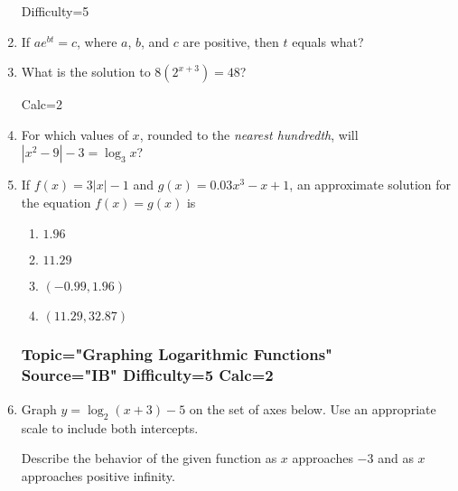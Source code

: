 \documentclass[12pt, oneside]{article}
\begin{document}
\begin{enumerate}
Difficulty=5
\item If $ae^{bt}=c$, where $a$, $b$, and $c$ are positive, then $t$ equals what? %

\item What is the solution to $8(2^{x+3})=48$? %

Calc=2
\item For which values of $x$, rounded to the \emph{nearest hundredth}, will $|x^2-9|-3= \log_3 x$?  %

\item If $f(x)=3|x| -1$ and $g(x)= 0.03x^3 -x +1$, an approximate solution for the equation $f(x)= g(x)$ is
\begin{enumerate}
    \item $1.96$
    \item $11.29$
    \item $(-0.99, 1.96)$
    \item $(11.29, 32.87)$
\end{enumerate}

\subsubsection*{Topic="Graphing Logarithmic Functions"\\
Source="IB" 
Difficulty=5 
Calc=2}

\item Graph $y= \log_2(x+3)-5$ on the set of axes below. Use an appropriate scale to include both intercepts.
\begin{center}
\end{center}

Describe the behavior of the given function as $x$ approaches $-3$ and as $x$ approaches positive infinity. %


\end{enumerate}
\end{document}
